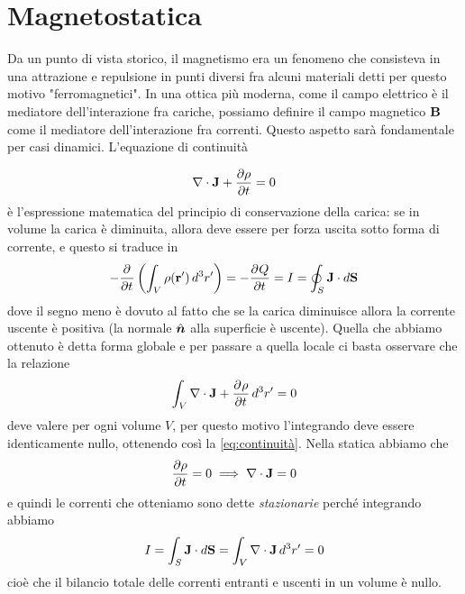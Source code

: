 \chapter{Magnetostatica}
Da un punto di vista storico, il magnetismo era un fenomeno che consisteva in una attrazione e repulsione in punti diversi fra alcuni materiali 
detti per questo motivo "ferromagnetici". In una ottica più moderna, come il campo elettrico è il mediatore dell'interazione fra cariche, possiamo 
definire il campo magnetico $\mathbf{B}$ come il mediatore dell'interazione fra correnti. Questo aspetto sarà fondamentale per casi dinamici.
L'equazione di continuità

\begin{equation} \label{eq:continuità}
  \nabla\cdot \mathbf{J} + \frac{\partial\rho}{\partial t} = 0
\end{equation}
è l'espressione matematica del principio di conservazione della carica: se in volume la carica è diminuita, allora deve essere per forza uscita sotto forma 
di corrente, e questo si traduce in 
\begin{align}
  -\frac{\partial^{} {}}{\partial {t}^{}} \left( \int_V \rho(\mathbf{r'}) \,d^3r' \right) = - \frac{\partial^{} {Q}}{\partial {t}^{}} = I = \oint_S \mathbf{J} \cdot d\mathbf{S} 
\end{align}
dove il segno meno è dovuto al fatto che se la carica diminuisce allora la corrente uscente è positiva (la normale $ \hat{\boldsymbol{n}} $ alla superficie è uscente). 
Quella che abbiamo ottenuto è detta forma globale e per passare a quella locale ci basta osservare che la relazione
\begin{align}
  \int_V \nabla \cdot \mathbf{J} + \frac{\partial^{} {\rho}}{\partial {t}^{}} \,d^3r' = 0
\end{align}
deve valere per ogni volume $ V $, per questo motivo l'integrando deve essere identicamente nullo, ottenendo così la \eqref{eq:continuità}.
Nella statica abbiamo che
\begin{align}
  \frac{\partial\rho}{\partial t} = 0 \implies\nabla\cdot\mathbf{J} = 0
\end{align}
e quindi le correnti che otteniamo sono dette \textit{stazionarie} perché integrando abbiamo
\begin{align}
  I = \int_S \mathbf{J} \cdot d\mathbf{S} = \int_V \nabla \cdot \mathbf{J} \, d^3r' = 0
\end{align}
cioè che il bilancio totale delle correnti entranti e uscenti in un volume è nullo.

